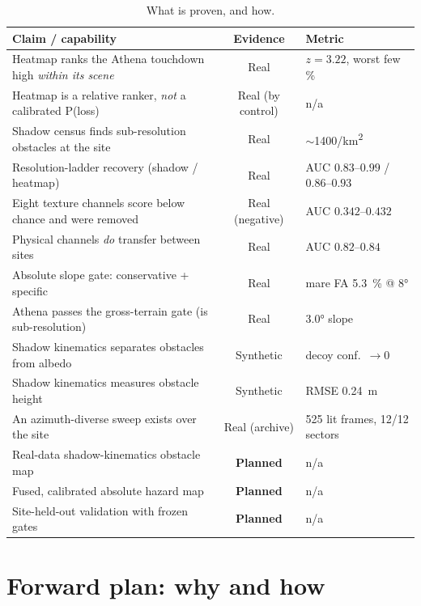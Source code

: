 \documentclass[11pt]{article}
\begin{document}
\begin{table}[h]
\centering\small
\caption{What is proven, and how.}
\label{tab:ledger}
\renewcommand{\arraystretch}{1.15}
\begin{tabular}{p{8.6cm} c p{3.5cm}}
\toprule
Claim / capability & Evidence & Metric \\
\midrule
Heatmap ranks the Athena touchdown high \emph{within its scene} & Real & $z=3.22$, worst few \% \\
Heatmap is a relative ranker, \emph{not} a calibrated P(loss) & Real (by control) & n/a \\
Shadow census finds sub-resolution obstacles at the site & Real & $\sim$\num{1400}/\si{\kilo\meter\squared} \\
Resolution-ladder recovery (shadow / heatmap) & Real & AUC $0.83$--$0.99$ / $0.86$--$0.93$ \\
Eight texture channels score below chance and were removed & Real (negative) & AUC $0.342$--$0.432$ \\
Physical channels \emph{do} transfer between sites & Real & AUC $0.82$--$0.84$ \\
Absolute slope gate: conservative + specific & Real & mare FA \SI{5.3}{\percent} @ \ang{8} \\
Athena passes the gross-terrain gate (is sub-resolution) & Real & \ang{3.0} slope \\
Shadow kinematics separates obstacles from albedo & Synthetic & decoy conf.\ $\to 0$ \\
Shadow kinematics measures obstacle height & Synthetic & RMSE \SI{0.24}{\meter} \\
An azimuth-diverse sweep exists over the site & Real (archive) & 525 lit frames, 12/12 sectors \\
Real-data shadow-kinematics obstacle map & \textbf{Planned} & n/a \\
Fused, calibrated absolute hazard map & \textbf{Planned} & n/a \\
Site-held-out validation with frozen gates & \textbf{Planned} & n/a \\
\bottomrule
\end{tabular}
\end{table}

\section{Forward plan: why and how}
\end{document}
